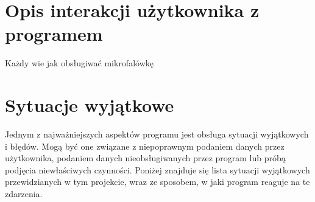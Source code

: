 \documentclass[a4paper,12pt]{article}
\newcommand\tab[1][0.6cm]{\hspace*{#1} }
\begin{document}
\section{Opis interakcji użytkownika z programem}

Każdy wie jak obsługiwać mikrofalówkę

\section{Sytuacje wyjątkowe}

\tab Jednym z najważniejszych aspektów programu jest obsługa sytuacji wyjątkowych i błędów. Mogą być one związane z niepoprawnym podaniem danych przez użytkownika, podaniem danych nieobsługiwanych przez program lub próbą podjęcia niewłaściwych czynności. Poniżej znajduje się lista sytuacji wyjątkowych przewidzianych w tym projekcie, wraz ze sposobem, w jaki program reaguje na te zdarzenia.
\end{document}
